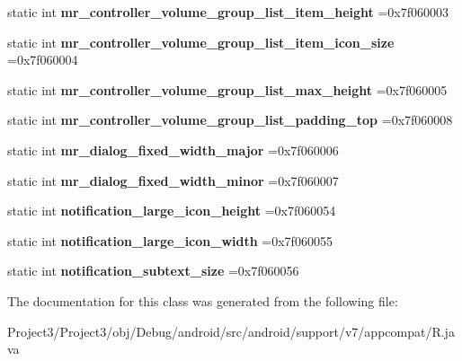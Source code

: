 \begin{DoxyCompactItemize}
static int {\bfseries mr\+\_\+controller\+\_\+volume\+\_\+group\+\_\+list\+\_\+item\+\_\+height} =0x7f060003
\item 
\mbox{\label{classandroid_1_1support_1_1v7_1_1appcompat_1_1R_1_1dimen_a72779be9aef6723c6e968769cc662c09}} 
static int {\bfseries mr\+\_\+controller\+\_\+volume\+\_\+group\+\_\+list\+\_\+item\+\_\+icon\+\_\+size} =0x7f060004
\item 
\mbox{\label{classandroid_1_1support_1_1v7_1_1appcompat_1_1R_1_1dimen_a6e301e453212f1ffaf4c252d9c76d453}} 
static int {\bfseries mr\+\_\+controller\+\_\+volume\+\_\+group\+\_\+list\+\_\+max\+\_\+height} =0x7f060005
\item 
\mbox{\label{classandroid_1_1support_1_1v7_1_1appcompat_1_1R_1_1dimen_a6c39045d848eb67c09e9f21508684305}} 
static int {\bfseries mr\+\_\+controller\+\_\+volume\+\_\+group\+\_\+list\+\_\+padding\+\_\+top} =0x7f060008
\item 
\mbox{\label{classandroid_1_1support_1_1v7_1_1appcompat_1_1R_1_1dimen_af40a319e4f8b12269cedebc53fa0dc2f}} 
static int {\bfseries mr\+\_\+dialog\+\_\+fixed\+\_\+width\+\_\+major} =0x7f060006
\item 
\mbox{\label{classandroid_1_1support_1_1v7_1_1appcompat_1_1R_1_1dimen_af4271575d5132ba92429590ab43e5f21}} 
static int {\bfseries mr\+\_\+dialog\+\_\+fixed\+\_\+width\+\_\+minor} =0x7f060007
\item 
\mbox{\label{classandroid_1_1support_1_1v7_1_1appcompat_1_1R_1_1dimen_ac4b18a439024d8ae686c6d3fabffd27e}} 
static int {\bfseries notification\+\_\+large\+\_\+icon\+\_\+height} =0x7f060054
\item 
\mbox{\label{classandroid_1_1support_1_1v7_1_1appcompat_1_1R_1_1dimen_ae23844d118318ec8d2e124d6d9f59635}} 
static int {\bfseries notification\+\_\+large\+\_\+icon\+\_\+width} =0x7f060055
\item 
\mbox{\label{classandroid_1_1support_1_1v7_1_1appcompat_1_1R_1_1dimen_a4dcfbcb4e46e68bd77aaa000087e05cc}} 
static int {\bfseries notification\+\_\+subtext\+\_\+size} =0x7f060056
\end{DoxyCompactItemize}


The documentation for this class was generated from the following file\+:\begin{DoxyCompactItemize}
\item 
Project3/\+Project3/obj/\+Debug/android/src/android/support/v7/appcompat/R.\+java\end{DoxyCompactItemize}

